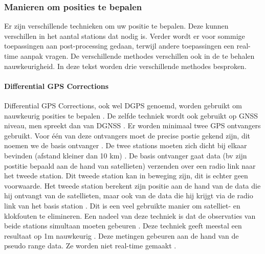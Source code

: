 \subsubsection{Manieren om posities te bepalen}
Er zijn verschillende technieken om uw positie te bepalen. Deze kunnen verschillen in het aantal stations dat nodig is. Verder wordt er voor sommige toepassingen aan post-processing gedaan, terwijl andere toepassingen een real-time aanpak vragen. De verschillende methodes verschillen ook in de te behalen nauwkeurigheid. In deze tekst worden drie verschillende methodes besproken. 

\paragraph{Differential GPS Corrections}
Differential GPS Corrections, ook wel DGPS genoemd, worden gebruikt om nauwkeurig posities  te bepalen \cite{LBibGLONASS2}. De zelfde techniek wordt ook gebruikt op GNSS niveau, men spreekt dan van DGNSS \cite{LBibGNSS8}. Er worden minimaal twee GPS ontvangers gebruikt. Voor \'e\'en van deze ontvangers moet de precise postie gekend zijn, dit noemen we de basis ontvanger \cite{LBibGNSS2,LBibRTK}. De twee stations moeten zich dicht bij elkaar bevinden (afstand kleiner dan 10 km) \cite{LBibDGPS}. De basis ontvanger gaat data (bv zijn postitie bepaald aan de hand van satellieten) verzenden over een radio link naar het tweede station.  Dit tweede station kan in beweging zijn, dit is echter geen voorwaarde. Het tweede station berekent zijn positie aan de hand van de data die hij ontvangt van de satellieten, maar ook van de data die hij krijgt via de radio link van het basis station \cite{LBibRTK}. Dit is een veel gebruikte manier om satelliet- en klokfouten te elimineren. Een nadeel van deze techniek is dat de observaties van beide stations simultaan moeten gebeuren \cite{LBibGNSS2}. Deze techniek geeft meestal een resultaat op 1m nauwkeurig \cite{LBibRTK}. Deze metingen gebeuren aan de hand van de pseudo range data. Ze worden niet real-time gemaakt \cite{LBibRTK3}.

